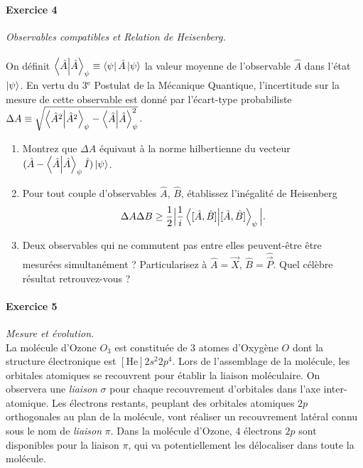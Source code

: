 \paragraph{Exercice 4} \textit{Observables compatibles et Relation de Heisenberg.} \\\vspace{-10pt}\\

On définit $\braket{\hat A}_\psi \equiv \bra{\psi} \hat A \ket{\psi}$ la valeur moyenne de l'observable $\hat A$ dans l'état $\ket{\psi}$. En vertu du 3$^{\text{e}}$ Postulat de la Mécanique Quantique, l'incertitude sur la mesure de cette observable est donné par l'écart-type probabiliste $\Delta A \equiv \sqrt{\braket{\hat A^2}_\psi - \braket{\hat A}_\psi^2}$. 
\begin{enumerate}
	\item Montrez que $\Delta A$ équivaut à la norme hilbertienne du vecteur $(\hat A - \braket{\hat A}_\psi \hat I) \ket{\psi}$.
	\item Pour tout couple d'observables $\hat A$, $\hat B$, établissez l'inégalité de Heisenberg
		\begin{equation}
		\Delta A \Delta B \geq \frac{1}{2} \Big| \frac{1}{i} \braket{[\hat A,\hat B]}_\psi \Big|.
		\end{equation}
	\item Deux observables qui ne commutent pas entre elles peuvent-être être mesurées simultanément ? Particularisez à $\hat A = \hat{\vec{X}}$, $\hat B = \hat{\vec{P}}$. Quel célèbre résultat retrouvez-vous ?
\end{enumerate}

\paragraph{Exercice 5} \textit{Mesure et évolution.} \\
La molécule d'Ozone $O_3$ est constituée de 3 atomes d'Oxygène $O$ dont la structure électronique est $[\text{He}]2s^2 2p^4$. Lors de l'assemblage de la molécule, les orbitales atomiques se recouvrent pour établir la liaison moléculaire. On observera une \textit{liaison} $\sigma$ pour chaque recouvrement d'orbitales dans l'axe inter-atomique. Les électrons restants, peuplant des orbitales atomiques $2p$ orthogonales au plan de la molécule, vont réaliser un recouvrement latéral connu sous le nom de \textit{liaison} $\pi$. Dans la molécule d'Ozone, 4 électrons $2p$ sont disponibles pour la liaison $\pi$, qui va potentiellement les délocaliser dans toute la molécule. \\

